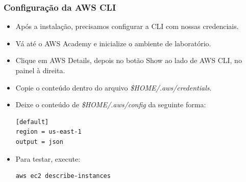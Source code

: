\documentclass{beamer}
\begin{document}
   \begin{frame}[fragile]
      \frametitle{Configuração da AWS CLI}
      \begin{itemize}
         \item Após a instalação, precisamos configurar a CLI com nossas credenciais.
         \item Vá até o AWS Academy e inicialize o ambiente de laboratório.
         \item Clique em AWS Details, depois no botão Show ao lado de AWS CLI, no painel à direita.
         \item Copie o conteúdo dentro do arquivo \textit{\$HOME/.aws/credentials}.     
         \item Deixe o conteúdo de \textit{\$HOME/.aws/config} da seguinte forma:
         \begin{verbatim}
[default]
region = us-east-1
output = json            
         \end{verbatim}
         \item Para testar, execute:
         \begin{verbatim}
aws ec2 describe-instances
         \end{verbatim}
      \end{itemize}
   \end{frame}
\end{document}
